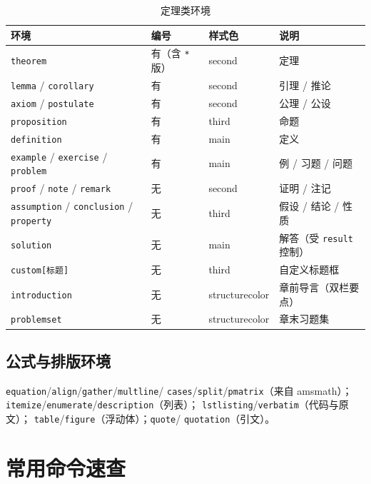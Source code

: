 \begin{table}[htbp]
  \centering
  \caption{定理类环境}\label{tab:env-quick}
  \begin{tabular}{llll}
    \toprule
    环境 & 编号 & 样式色 & 说明 \\
    \midrule
    \texttt{theorem} & 有（含 \texttt{*} 版） & second & 定理 \\
    \texttt{lemma} / \texttt{corollary} & 有 & second & 引理 / 推论 \\
    \texttt{axiom} / \texttt{postulate} & 有 & second & 公理 / 公设 \\
    \texttt{proposition} & 有 & third & 命题 \\
    \texttt{definition} & 有 & main & 定义 \\
    \texttt{example} / \texttt{exercise} / \texttt{problem} & 有 & main & 例 / 习题 / 问题 \\
    \texttt{proof} / \texttt{note} / \texttt{remark} & 无 & second & 证明 / 注记 \\
    \texttt{assumption} / \texttt{conclusion} / \texttt{property} & 无 & third & 假设 / 结论 / 性质 \\
    \texttt{solution} & 无 & main & 解答（受 \texttt{result} 控制）\\
    \texttt{custom[标题]} & 无 & third & 自定义标题框 \\
    \texttt{introduction} & 无 & structurecolor & 章前导言（双栏要点）\\
    \texttt{problemset} & 无 & structurecolor & 章末习题集 \\
    \bottomrule
  \end{tabular}
\end{table}

\subsection{公式与排版环境}

\texttt{equation}/\texttt{align}/\texttt{gather}/\texttt{multline}/
\texttt{cases}/\texttt{split}/\texttt{pmatrix}（来自 amsmath）；
\texttt{itemize}/\texttt{enumerate}/\texttt{description}（列表）；
\texttt{lstlisting}/\texttt{verbatim}（代码与原文）；
\texttt{table}/\texttt{figure}（浮动体）；\texttt{quote}/
\texttt{quotation}（引文）。

\section{常用命令速查}

